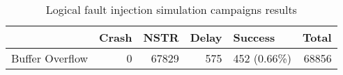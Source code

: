 \begin{table}[t]
\centering
\caption{Logical fault injection simulation campaigns results}
\label{table:end_sim_by_status_hamming_single_bitflip_spatial}
\begin{tabular}{lrrrlr}
\toprule
 & Crash & NSTR & Delay & Success & Total \\
\midrule
Buffer Overflow & 0 & 67829 & 575 & 452 (0.66\%) & 68856 \\
\bottomrule
\end{tabular}
\end{table}
